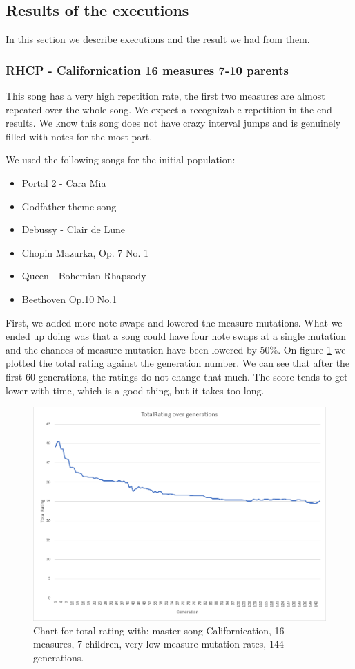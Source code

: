\documentclass[a4paper]{article}
\begin{document}
\subsection{Results of the executions}
In this section we describe executions and the result we had from them.
\subsubsection{RHCP - Californication 16 measures 7-10 parents}
This song has a very high repetition rate, the first two measures are almost repeated over the whole song. We expect a recognizable repetition in the end results. We know this song does not have crazy interval jumps and is genuinely filled with notes for the most part. 

We used the following songs for the initial population:
\begin{itemize}
	\item Portal 2 - Cara Mia
	\item Godfather theme song
	\item Debussy - Clair de Lune
	\item Chopin Mazurka, Op. 7 No. 1
	\item Queen - Bohemian Rhapsody 
	\item Beethoven Op.10 No.1 
\end{itemize}

First, we added more note swaps and lowered the measure mutations. What we ended up doing was that a song could have four note swaps at a single mutation and the chances of measure mutation have been lowered by 50\%. On figure \ref{fig:rhcp_1} we plotted the total rating against the generation number. We can see that after the first 60 generations, the ratings do not change that much. The score tends to get lower with time, which is a good thing, but it takes too long. 

\begin{figure}[H]
	\advance\leftskip-1.5cm
	\includegraphics[width=1.2\textwidth]{Fotos/results/rhcp/total_rating_graph.png}
	\caption{Chart for total rating with: master song Californication, 16 measures, 7 children, very low measure mutation rates, 144 generations.}
	\label{fig:rhcp_1}
\end{figure}
\end{document}
